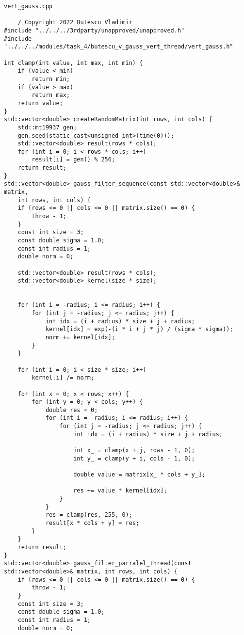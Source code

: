 \documentclass{report}
\begin{document}
\begin{lstlisting}
vert_gauss.cpp

	/ Copyright 2022 Butescu Vladimir
#include "../../../3rdparty/unapproved/unapproved.h"
#include "../../../modules/task_4/butescu_v_gauss_vert_thread/vert_gauss.h"

int clamp(int value, int max, int min) {
    if (value < min)
        return min;
    if (value > max)
        return max;
    return value;
}
std::vector<double> createRandomMatrix(int rows, int cols) {
    std::mt19937 gen;
    gen.seed(static_cast<unsigned int>(time(0)));
    std::vector<double> result(rows * cols);
    for (int i = 0; i < rows * cols; i++)
        result[i] = gen() % 256;
    return result;
}
std::vector<double> gauss_filter_sequence(const std::vector<double>& matrix,
    int rows, int cols) {
    if (rows <= 0 || cols <= 0 || matrix.size() == 0) {
        throw - 1;
    }
    const int size = 3;
    const double sigma = 1.0;
    const int radius = 1;
    double norm = 0;

    std::vector<double> result(rows * cols);
    std::vector<double> kernel(size * size);


    for (int i = -radius; i <= radius; i++) {
        for (int j = -radius; j <= radius; j++) {
            int idx = (i + radius) * size + j + radius;
            kernel[idx] = exp(-(i * i + j * j) / (sigma * sigma));
            norm += kernel[idx];
        }
    }

    for (int i = 0; i < size * size; i++)
        kernel[i] /= norm;

    for (int x = 0; x < rows; x++) {
        for (int y = 0; y < cols; y++) {
            double res = 0;
            for (int i = -radius; i <= radius; i++) {
                for (int j = -radius; j <= radius; j++) {
                    int idx = (i + radius) * size + j + radius;

                    int x_ = clamp(x + j, rows - 1, 0);
                    int y_ = clamp(y + i, cols - 1, 0);

                    double value = matrix[x_ * cols + y_];

                    res += value * kernel[idx];
                }
            }
            res = clamp(res, 255, 0);
            result[x * cols + y] = res;
        }
    }
    return result;
}
std::vector<double> gauss_filter_parralel_thread(const std::vector<double>& matrix, int rows, int cols) {
    if (rows <= 0 || cols <= 0 || matrix.size() == 0) {
        throw - 1;
    }
    const int size = 3;
    const double sigma = 1.0;
    const int radius = 1;
    double norm = 0;


\end{lstlisting}
\end{document}
